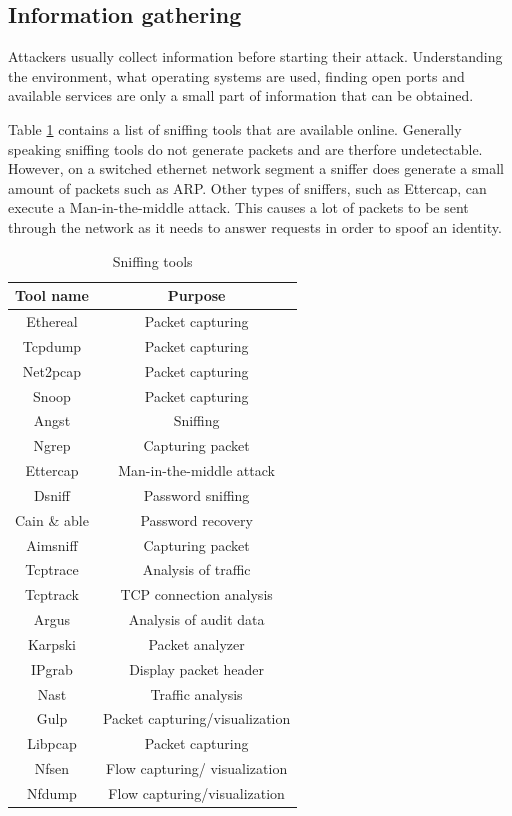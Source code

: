 \documentclass[conference]{IEEEtran}
\begin{document}
\subsection{Information gathering}
Attackers usually collect information before starting their attack. Understanding the environment, what operating systems are used, finding open ports and available services are only a small part of information that can be obtained. 

\smallskip Table \ref{table:sniffing-tools} contains a list of sniffing tools that are available online. Generally speaking sniffing tools do not generate packets and are therfore undetectable. However, on a switched ethernet network segment a sniffer does generate a small amount of packets such as ARP\cite{b9}. Other types of sniffers, such as Ettercap, can execute a Man-in-the-middle attack. This causes a lot of packets to be sent through the network as it needs to answer requests in order to spoof an identity.

\begin{table}[htbp]
\caption{Sniffing tools \cite{b1}} 
\centering
\begin{tabular}{ | c | c | }
\hline
Tool name & Purpose \\
\hline
Ethereal & Packet capturing \\
Tcpdump & Packet capturing  \\
Net2pcap & Packet capturing  \\
Snoop & Packet capturing \\
Angst & Sniffing  \\
Ngrep & Capturing packet  \\
Ettercap & Man-in-the-middle attack  \\
Dsniff & Password sniffing  \\
Cain \& able & Password recovery  \\
Aimsniff & Capturing packet \\
Tcptrace & Analysis of traffic \\
Tcptrack & TCP connection analysis  \\
Argus & Analysis of audit data \\
Karpski & Packet analyzer \\
IPgrab & Display packet header \\
Nast & Traffic analysis \\
Gulp & Packet capturing/visualization \\
Libpcap & Packet capturing \\
Nfsen & Flow capturing/ visualization \\
Nfdump & Flow capturing/visualization \\
\hline
\end{tabular}
\label{table:sniffing-tools}
\end{table}
\end{document}
